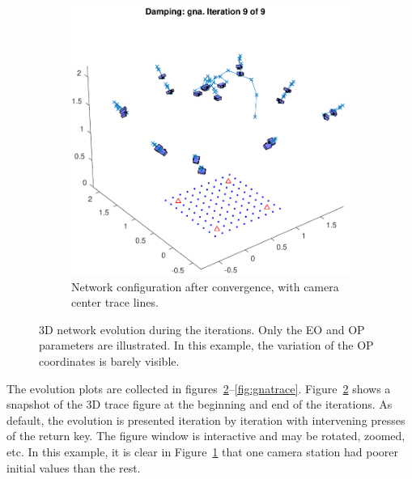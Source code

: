 \documentclass{article}
\begin{document}
\begin{figure}
  \begin{subfigure}[b]{0.7\textwidth}
    \includegraphics[width=\textwidth]{ill/ccamxfinal}
    \caption{Network configuration after convergence, with camera
      center trace lines.}
    \label{fig:camxfinal}
  \end{subfigure}
  \caption{3D network evolution during the iterations. Only the EO and
    OP parameters are illustrated. In this example, the variation of
    the OP coordinates is barely visible. }\label{fig:net3DTrace}
\end{figure}

The evolution plots are collected in
figures~\ref{fig:net3DTrace}--\ref{fig:gnatrace}.
Figure~\ref{fig:net3DTrace} shows a snapshot of the 3D trace figure at
the beginning and end of the iterations. As default, the evolution is
presented iteration by iteration with intervening presses of the
return key. The figure window is interactive and may be rotated,
zoomed, etc. In this example, it is clear in
Figure~\ref{fig:camxfinal} that one camera station had poorer initial
values than the rest.
\end{document}

